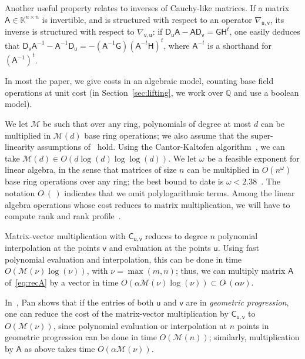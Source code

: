 \documentclass{sig-alternate}
\newcommand{\vu}{\ensuremath{\mathsf{u}}}
\newcommand{\vv}{\ensuremath{\mathsf{v}}}
\newcommand{\mA}{\ensuremath{\mathsf{A}}}
\newcommand{\mC}{\ensuremath{\mathsf{C}}}
\newcommand{\mD}{\ensuremath{\mathsf{D}}}
\newcommand{\mG}{\ensuremath{\mathsf{G}}}
\newcommand{\mH}{\ensuremath{\mathsf{H}}}
\newcommand{\K}{\ensuremath{\mathbb{K}}}
\newcommand{\Q}{\ensuremath{\mathbb{Q}}}
\newcommand{\M}{\ensuremath{\mathscr{M}}}
\newcommand{\mx}{\ensuremath{\nu}}
\newcommand{\Otilde}[1]{\ensuremath{O\tilde{~}(#1)}} %
\begin{document}
Another useful property relates to inverses of Cauchy-like matrices.
If a matrix $\mA \in \K^{n\times n}$ is invertible, and is structured
with respect to an operator $\nabla_{\vu,\vv}$, its inverse is
structured with respect to $\nabla_{\vv,\vu}$: if $\mD_\vu \mA - \mA
\mD_\vv = \mG \mH^t$, one easily deduces that $\mD_\vv \mA^{-1} -
\mA^{-1} \mD_\vu = - (\mA^{-1} \mG) (\mA^{-t} \mH)^t$, where $\mA^{-t}$
is a shorthand for $(\mA^{-1})^t$.


\smallskip{}  In most the paper, we
give costs in an algebraic model, counting base field operations at
unit cost (in Section~\ref{sec:lifting}, we work over $\Q$ and use 
a boolean model).

We let $\M$ be such that over any ring, polynomials of degree at most
$d$ can be multiplied in $\M(d)$ base ring operations; we also assume
that the super-linearity assumptions of~\cite[Chapter~8]{GaGe13}
hold. Using the Cantor-Kaltofen algorithm~\cite{CaKa91}, we can take
$\M(d)\in O(d \log(d)\log\log(d))$. We let $\omega$ be a feasible
exponent for linear algebra, in the sense that matrices of size $n$
can be multiplied in $O(n^\omega)$ base ring operations over any ring;
the best bound to date is $\omega < 2.38$~\cite{CoWi90, LeGall14}.
The notation $\Otilde{\,}$ indicates that we omit polylogarithmic
terms. Among the linear algebra operations whose cost reduces to matrix
multiplication, we will have to compute rank and rank
profile~\cite{IbMoHu82}.

Matrix-vector multiplication with $\mC_{\vu,\vv}$ reduces to degree
$n$ polynomial interpolation at the points $\vv$ and evaluation at the
points $\vu$. Using fast polynomial evaluation and interpolation, this
can be done in time $O(\M(\mx)\log(\mx))$, with $\mx=\max(m,n)$; thus, we
can multiply matrix $\mA$ of~\eqref{eq:recA} by a vector in time
$O(\alpha \M(\mx)\log(\mx))\subset \Otilde{\alpha \mx}$.

In~\cite[Theorem~4.7.3]{Pan01}, Pan shows that if the entries of both
$\vu$ and $\vv$ are in {\em geometric progression}, one can reduce the
cost of the matrix-vector multiplication by $\mC_{\vu,\vv}$ to
$O(\M(\mx))$, since polynomial evaluation or interpolation at $n$
points in geometric progression can be done in time $O(\M(n))$;
similarly, multiplication by $\mA$ as above takes time
$O(\alpha\M(\mx))$.
\end{document}
